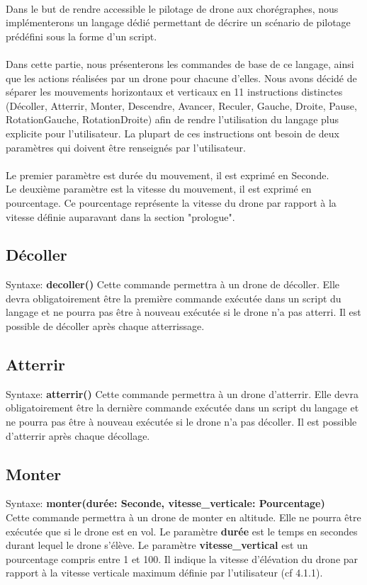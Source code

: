\documentclass[12pt, openany]{report}
\begin{document}
\paragraph{}
Dans le but de rendre accessible le pilotage de drone aux chorégraphes, nous implémenterons un langage dédié permettant de décrire un scénario de pilotage prédéfini sous la forme d'un script.\\ \\
Dans cette partie, nous présenterons les commandes de base de ce langage, ainsi que les actions réalisées par un drone pour chacune d'elles.
Nous avons décidé de séparer les mouvements horizontaux et verticaux en 11 instructions distinctes (Décoller, Atterrir, Monter, Descendre, Avancer, Reculer, Gauche, Droite, Pause, RotationGauche, RotationDroite) afin de rendre l'utilisation du langage plus explicite pour l'utilisateur. La plupart de ces instructions ont besoin de deux paramètres qui doivent être renseignés par l'utilisateur. \\ \\
Le premier paramètre est durée du mouvement, il est exprimé en Seconde.\\
Le deuxième paramètre est la vitesse du mouvement, il est exprimé en pourcentage. Ce pourcentage représente la vitesse du drone par rapport à la vitesse définie auparavant dans la section "prologue".\\

\subsection{Décoller}
\quad Syntaxe: \textbf{decoller()}\bigbreak
Cette commande permettra à un drone de décoller. Elle devra obligatoirement être la première commande exécutée dans un script du langage et ne pourra pas être à nouveau exécutée si le drone n'a pas atterri. Il est possible de décoller après chaque atterrissage. 

\subsection{Atterrir}
\quad Syntaxe: \textbf{atterrir()}\bigbreak
Cette commande permettra à un drone d'atterrir. Elle devra obligatoirement être la dernière commande exécutée dans un script du langage et ne pourra pas être à nouveau exécutée si le drone n'a pas décoller. Il est possible d'atterrir après chaque décollage.

\subsection{Monter}
\quad Syntaxe: \textbf{monter(durée: Seconde, vitesse\_verticale: Pourcentage)} \\
Cette commande permettra à un drone de monter en altitude. 
Elle ne pourra être exécutée que si le drone est en vol.
Le paramètre \textbf{durée} est le temps en secondes durant lequel le drone s'élève. 
Le paramètre \textbf{vitesse\_vertical} est un pourcentage compris entre 1 et 100. Il indique la vitesse d'élévation du drone par rapport à la vitesse verticale maximum définie par l'utilisateur (cf 4.1.1). \\
\end{document}

